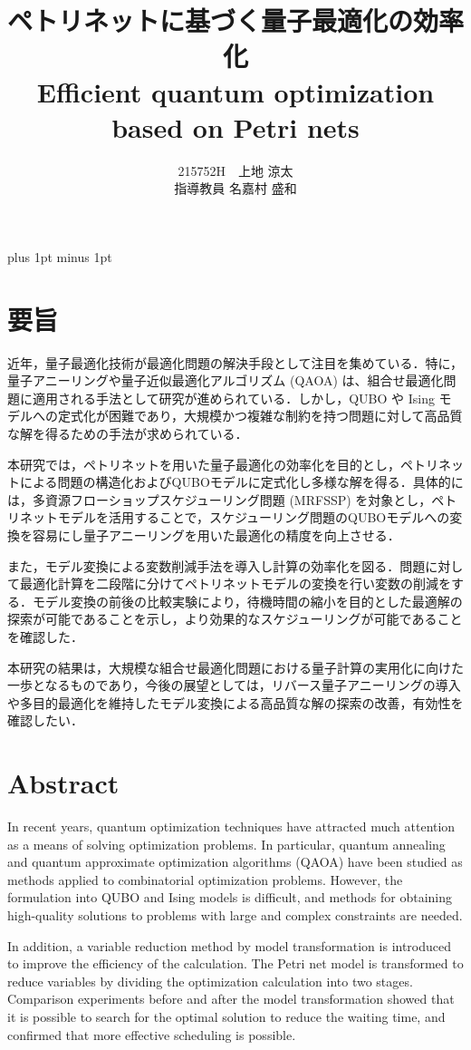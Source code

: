 \documentclass[a4j,12pt]{jreport}
\title{ペトリネットに基づく量子最適化の効率化\\
Efficient quantum optimization based on Petri nets}
\author{215752H　上地 涼太  \\ 指導教員 {名嘉村 盛和} }
\begin{document}
\maketitle
\baselineskip 17pt plus 1pt minus 1pt


\setcounter{page}{0}

\section*{要旨}
近年，量子最適化技術が最適化問題の解決手段として注目を集めている．特に，量子アニーリングや量子近似最適化アルゴリズム (QAOA) は、組合せ最適化問題に適用される手法として研究が進められている．しかし，QUBO  や Ising モデルへの定式化が困難であり，大規模かつ複雑な制約を持つ問題に対して高品質な解を得るための手法が求められている．

本研究では，ペトリネットを用いた量子最適化の効率化を目的とし，ペトリネットによる問題の構造化およびQUBOモデルに定式化し多様な解を得る．具体的には，多資源フローショップスケジューリング問題 (MRFSSP) を対象とし，ペトリネットモデルを活用することで，スケジューリング問題のQUBOモデルへの変換を容易にし量子アニーリングを用いた最適化の精度を向上させる．

また，モデル変換による変数削減手法を導入し計算の効率化を図る．問題に対して最適化計算を二段階に分けてペトリネットモデルの変換を行い変数の削減をする．モデル変換の前後の比較実験により，待機時間の縮小を目的とした最適解の探索が可能であることを示し，より効果的なスケジューリングが可能であることを確認した．

本研究の結果は，大規模な組合せ最適化問題における量子計算の実用化に向けた一歩となるものであり，今後の展望としては，リバース量子アニーリングの導入や多目的最適化を維持したモデル変換による高品質な解の探索の改善，有効性を確認したい．

\clearpage
\section*{Abstract}
In recent years, quantum optimization techniques have attracted much attention as a means of solving optimization problems. In particular, quantum annealing and quantum approximate optimization algorithms (QAOA) have been studied as methods applied to combinatorial optimization problems. However, the formulation into QUBO and Ising models is difficult, and methods for obtaining high-quality solutions to problems with large and complex constraints are needed.

In addition, a variable reduction method by model transformation is introduced to improve the efficiency of the calculation. The Petri net model is transformed to reduce variables by dividing the optimization calculation into two stages. Comparison experiments before and after the model transformation showed that it is possible to search for the optimal solution to reduce the waiting time, and confirmed that more effective scheduling is possible.
\end{document}
